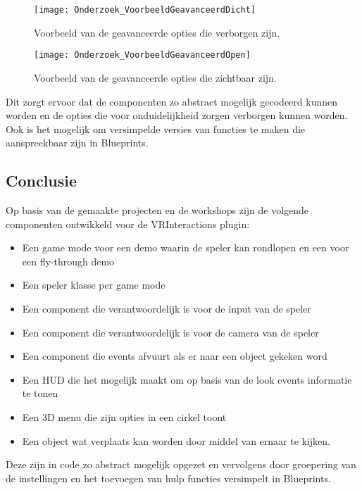 \begin{figure}[H]
  \centering
    \texttt{[image: Onderzoek\_VoorbeeldGeavanceerdDicht]}
    \caption{Voorbeeld van de geavanceerde opties die verborgen zijn.}
  \label{fig:advOptiesHidden}    
\end{figure}

\begin{figure}[H]
  \centering
    \texttt{[image: Onderzoek\_VoorbeeldGeavanceerdOpen]}
    \caption{Voorbeeld van de geavanceerde opties die zichtbaar zijn.}
  \label{fig:advOptiesVisible}
\end{figure}

Dit zorgt ervoor dat de componenten zo abstract mogelijk gecodeerd kunnen worden en de opties die voor onduidelijkheid zorgen verborgen kunnen worden. Ook is het mogelijk om versimpelde versies van functies te maken die aanspreekbaar zijn in Blueprints.

\subsection{Conclusie}
Op basis van de gemaakte projecten en de workshops zijn de volgende componenten ontwikkeld voor de VRInteractions plugin:

\begin{itemize}
	\item Een game mode voor een demo waarin de speler kan rondlopen en een voor een fly-through demo
	\item Een speler klasse per game mode
	\item Een component die verantwoordelijk is voor de input van de speler
	\item Een component die verantwoordelijk is voor de camera van de speler
	\item Een component die events afvuurt als er naar een object gekeken word
	\item Een HUD die het mogelijk maakt om op basis van de look events informatie te tonen
	\item Een 3D menu die zijn opties in een cirkel toont
	\item Een object wat verplaats kan worden door middel van ernaar te kijken.
\end{itemize}

Deze zijn in code zo abstract mogelijk opgezet en vervolgens door groepering van de instellingen en het toevoegen van hulp functies versimpelt in Blueprints.

